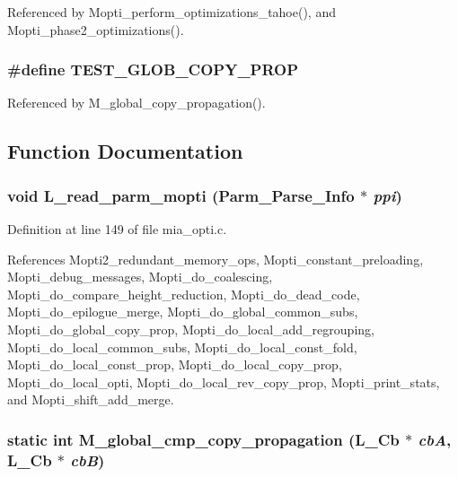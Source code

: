 Referenced by Mopti\_\-perform\_\-optimizations\_\-tahoe(), and Mopti\_\-phase2\_\-optimizations().
\subsubsection{\setlength{\rightskip}{0pt plus 5cm}\#define TEST\_\-GLOB\_\-COPY\_\-PROP}\label{mia__opti_8c_af60ad1a1361c3d327f1125e6f3cd23b}




Referenced by M\_\-global\_\-copy\_\-propagation().

\subsection{Function Documentation}
\subsubsection{\setlength{\rightskip}{0pt plus 5cm}void L\_\-read\_\-parm\_\-mopti (Parm\_\-Parse\_\-Info $\ast$ {\em ppi})}\label{mia__opti_8c_c4127ccba417f74a6dda847e3908e13f}




Definition at line 149 of file mia\_\-opti.c.

References Mopti2\_\-redundant\_\-memory\_\-ops, Mopti\_\-constant\_\-preloading, Mopti\_\-debug\_\-messages, Mopti\_\-do\_\-coalescing, Mopti\_\-do\_\-compare\_\-height\_\-reduction, Mopti\_\-do\_\-dead\_\-code, Mopti\_\-do\_\-epilogue\_\-merge, Mopti\_\-do\_\-global\_\-common\_\-subs, Mopti\_\-do\_\-global\_\-copy\_\-prop, Mopti\_\-do\_\-local\_\-add\_\-regrouping, Mopti\_\-do\_\-local\_\-common\_\-subs, Mopti\_\-do\_\-local\_\-const\_\-fold, Mopti\_\-do\_\-local\_\-const\_\-prop, Mopti\_\-do\_\-local\_\-copy\_\-prop, Mopti\_\-do\_\-local\_\-opti, Mopti\_\-do\_\-local\_\-rev\_\-copy\_\-prop, Mopti\_\-print\_\-stats, and Mopti\_\-shift\_\-add\_\-merge.
\subsubsection{\setlength{\rightskip}{0pt plus 5cm}static int M\_\-global\_\-cmp\_\-copy\_\-propagation (L\_\-Cb $\ast$ {\em cb\-A}, L\_\-Cb $\ast$ {\em cb\-B})\hspace{0.3cm}{\tt  [static]}}\label{mia__opti_8c_7b7e8106a32096cc469acedf6fd9cbd3}




